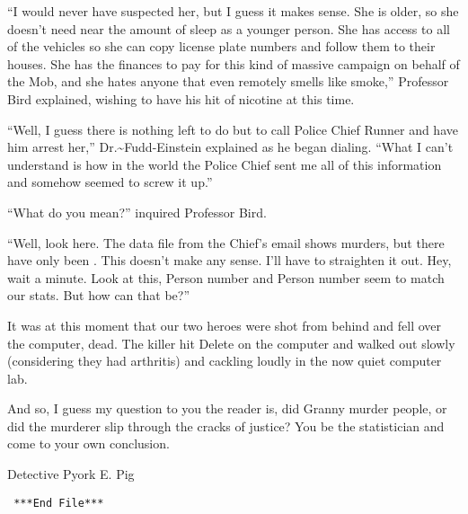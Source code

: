 \documentclass[captions=tableheading]{scrbook}
\begin{document}
“I would never have suspected her, but I guess it makes sense. She is older, so she doesn’t need near the amount of sleep as a younger person. She has access to all of the vehicles so she can copy license plate numbers and follow them to their houses. She has the finances to pay for this kind of massive campaign on behalf of the Mob, and she hates anyone that even remotely smells like smoke,” Professor Bird explained, wishing to have his hit of nicotine at this time.

“Well, I guess there is nothing left to do but to call Police Chief Runner and have him arrest her,” Dr.\~{}Fudd-Einstein explained as he began dialing. “What I can’t understand is how in the world the Police Chief sent me all of this information and somehow seemed to screw it up.”

“What do you mean?” inquired Professor Bird.

“Well, look here. The data file from the Chief's email shows 
 murders, but there have only been 
. This doesn’t make any sense. I’ll have to straighten it out. Hey, wait a minute. Look at this, Person number 
 and Person number 
 seem to match our stats. But how can that be?”

It was at this moment that our two heroes were shot from behind and fell over the computer, dead. The killer hit \textsf{Delete} on the computer and walked out slowly (considering they had arthritis) and cackling loudly in the now quiet computer lab.  

And so, I guess my question to you the reader is, did Granny murder 
 people, or did the murderer slip through the cracks of justice? You be the statistician and come to your own conclusion. 

Detective Pyork E. Pig 

\begin{verbatim}
 ***End File***
\end{verbatim}

\vfill{}

\cleardoublepage
{}
{}

\nocite{*}

\vfill{}
\cleardoublepage
{}
{} 
\printindex{}
\end{document}
